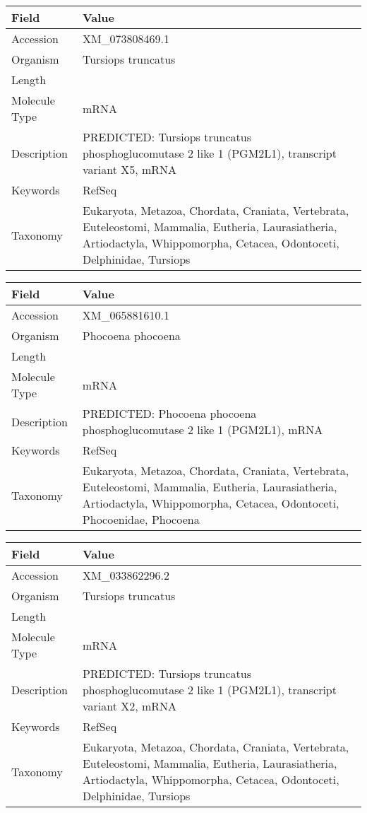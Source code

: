 \documentclass[10pt]{article}
\begin{document}
\vspace{1em}
{\footnotesize
\begin{longtable}{>{\raggedright\arraybackslash}p{4.5cm} >{\raggedright\arraybackslash}p{11.5cm}}
\textbf{Field} & \textbf{Value} \\
\hline
Accession & XM\_073808469.1 \\
Organism & Tursiops truncatus \\
Length & 3082 \\
Molecule Type & mRNA \\
Description & PREDICTED: Tursiops truncatus phosphoglucomutase 2 like 1 (PGM2L1), transcript variant X5, mRNA \\
Keywords & RefSeq \\
Taxonomy & Eukaryota, Metazoa, Chordata, Craniata, Vertebrata, Euteleostomi, Mammalia, Eutheria, Laurasiatheria, Artiodactyla, Whippomorpha, Cetacea, Odontoceti, Delphinidae, Tursiops \\
\end{longtable}
}

\vspace{1em}
{\footnotesize
\begin{longtable}{>{\raggedright\arraybackslash}p{4.5cm} >{\raggedright\arraybackslash}p{11.5cm}}
\textbf{Field} & \textbf{Value} \\
\hline
Accession & XM\_065881610.1 \\
Organism & Phocoena phocoena \\
Length & 2763 \\
Molecule Type & mRNA \\
Description & PREDICTED: Phocoena phocoena phosphoglucomutase 2 like 1 (PGM2L1), mRNA \\
Keywords & RefSeq \\
Taxonomy & Eukaryota, Metazoa, Chordata, Craniata, Vertebrata, Euteleostomi, Mammalia, Eutheria, Laurasiatheria, Artiodactyla, Whippomorpha, Cetacea, Odontoceti, Phocoenidae, Phocoena \\
\end{longtable}
}

\vspace{1em}
{\footnotesize
\begin{longtable}{>{\raggedright\arraybackslash}p{4.5cm} >{\raggedright\arraybackslash}p{11.5cm}}
\textbf{Field} & \textbf{Value} \\
\hline
Accession & XM\_033862296.2 \\
Organism & Tursiops truncatus \\
Length & 3341 \\
Molecule Type & mRNA \\
Description & PREDICTED: Tursiops truncatus phosphoglucomutase 2 like 1 (PGM2L1), transcript variant X2, mRNA \\
Keywords & RefSeq \\
Taxonomy & Eukaryota, Metazoa, Chordata, Craniata, Vertebrata, Euteleostomi, Mammalia, Eutheria, Laurasiatheria, Artiodactyla, Whippomorpha, Cetacea, Odontoceti, Delphinidae, Tursiops \\
\end{longtable}
}
\end{document}
